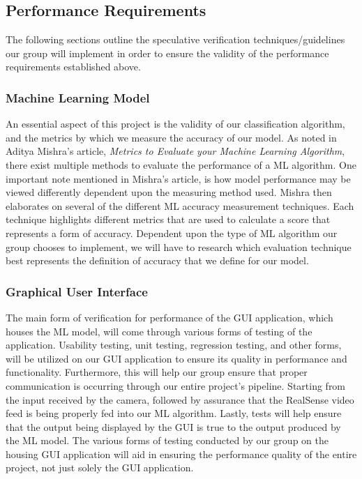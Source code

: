 \documentclass[onecolumn, draftclsnofoot,10pt, compsoc]{IEEEtran}
\begin{document}
\subsection{Performance Requirements}
The following sections outline the speculative verification techniques/guidelines our group will implement in order to ensure the validity of the performance requirements established above.

\subsubsection{Machine Learning Model}
An essential aspect of this project is the validity of our classification algorithm, and the metrics by which we measure the accuracy of our model. As noted in Aditya Mishra’s article, \textit{Metrics to Evaluate your Machine Learning Algorithm}, there exist multiple methods to evaluate the performance of a ML algorithm. One important note mentioned in Mishra’s article, is how model performance may be viewed differently dependent upon the measuring method used. Mishra then elaborates on several of the different ML accuracy measurement techniques. Each technique highlights different metrics that are used to calculate a score that represents a form of accuracy\cite{second}. Dependent upon the type of ML algorithm our group chooses to implement, we will have to research which evaluation technique best represents the definition of accuracy that we define for our model.

\subsubsection{Graphical User Interface}
The main form of verification for performance of the GUI application, which houses the ML model, will come through various forms of testing of the application. Usability testing, unit testing, regression testing, and other forms, will be utilized on our GUI application to ensure its quality in performance and functionality. Furthermore, this will help our group ensure that proper communication is occurring through our entire project’s pipeline. Starting from the input received by the camera, followed by assurance that the RealSense video feed is being properly fed into our ML algorithm. Lastly, tests will help ensure that the output being displayed by the GUI is true to the output produced by the ML model. The various forms of testing conducted by our group on the housing GUI application will aid in ensuring the performance quality of the entire project, not just solely the GUI application.
\end{document}
